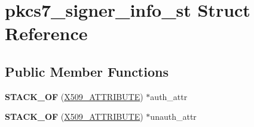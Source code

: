 \hypertarget{structpkcs7__signer__info__st}{}\section{pkcs7\+\_\+signer\+\_\+info\+\_\+st Struct Reference}
\label{structpkcs7__signer__info__st}
\subsection*{Public Member Functions}
\begin{DoxyCompactItemize}
\item 
\mbox{\label{structpkcs7__signer__info__st_a4a78a7d870979425a85ded7c85f5f155}} 
{\bfseries S\+T\+A\+C\+K\+\_\+\+OF} (\hyperlink{structx509__attributes__st}{X509\+\_\+\+A\+T\+T\+R\+I\+B\+U\+TE}) $\ast$auth\+\_\+attr
\item 
\mbox{\label{structpkcs7__signer__info__st_ae3184f9e496fbcb60ab81821707b698c}} 
{\bfseries S\+T\+A\+C\+K\+\_\+\+OF} (\hyperlink{structx509__attributes__st}{X509\+\_\+\+A\+T\+T\+R\+I\+B\+U\+TE}) $\ast$unauth\+\_\+attr
\end{DoxyCompactItemize}
